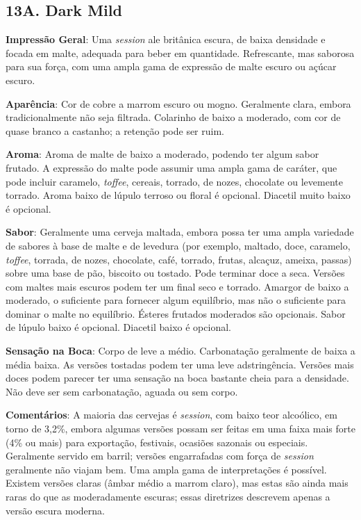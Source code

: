 \subsection*{13A. Dark Mild}

\textbf{Impressão Geral}: Uma \textit{session} ale britânica escura, de baixa densidade e focada em malte, adequada para beber em quantidade. Refrescante, mas saborosa para sua força, com uma ampla gama de expressão de malte escuro ou açúcar escuro.

\textbf{Aparência}: Cor de cobre a marrom escuro ou mogno. Geralmente clara, embora tradicionalmente não seja filtrada. Colarinho de baixo a moderado, com cor de quase branco a castanho; a retenção pode ser ruim.

\textbf{Aroma}: Aroma de malte de baixo a moderado, podendo ter algum sabor frutado. A expressão do malte pode assumir uma ampla gama de caráter, que pode incluir caramelo, \textit{toffee}, cereais, torrado, de nozes, chocolate ou levemente torrado. Aroma baixo de lúpulo terroso ou floral é opcional. Diacetil muito baixo é opcional.

\textbf{Sabor}: Geralmente uma cerveja maltada, embora possa ter uma ampla variedade de sabores à base de malte e de levedura (por exemplo, maltado, doce, caramelo, \textit{toffee}, torrada, de nozes, chocolate, café, torrado, frutas, alcaçuz, ameixa, passas) sobre uma base de pão, biscoito ou tostado. Pode terminar doce a seca. Versões com maltes mais escuros podem ter um final seco e torrado. Amargor de baixo a moderado, o suficiente para fornecer algum equilíbrio, mas não o suficiente para dominar o malte no equilíbrio. Ésteres frutados moderados são opcionais. Sabor de lúpulo baixo é opcional. Diacetil baixo é opcional.

\textbf{Sensação na Boca}: Corpo de leve a médio. Carbonatação geralmente de baixa a média baixa. As versões tostadas podem ter uma leve adstringência. Versões mais doces podem parecer ter uma sensação na boca bastante cheia para a densidade. Não deve ser sem carbonatação, aguada ou sem corpo.

\textbf{Comentários}: A maioria das cervejas é \textit{session}, com baixo teor alcoólico, em torno de 3,2\%, embora algumas versões possam ser feitas em uma faixa mais forte (4\% ou mais) para exportação, festivais, ocasiões sazonais ou especiais. Geralmente servido em barril; versões engarrafadas com força de \textit{session} geralmente não viajam bem. Uma ampla gama de interpretações é possível. Existem versões claras (âmbar médio a marrom claro), mas estas são ainda mais raras do que as moderadamente escuras; essas diretrizes descrevem apenas a versão escura moderna.

